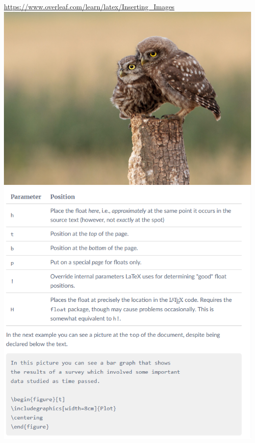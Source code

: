 \documentclass{article}
\begin{document}
\url{https://www.overleaf.com/learn/latex/Inserting_Images}
\includegraphics[scale=0.05]{img/sowa}
\includegraphics[scale=0.7]{pozycjonowanie}
\end{document}
